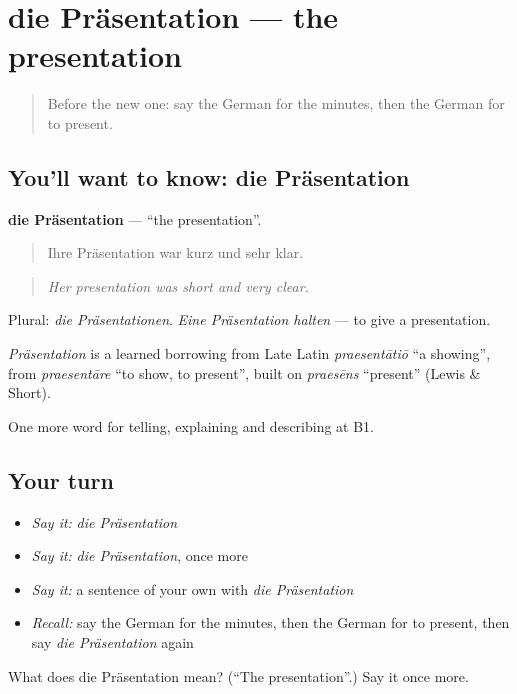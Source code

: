 \section[die Präsentation]{die Präsentation — the presentation}

\label{lesson:GE-C354-praesentation}



\begin{quote}
Before the new one: say the German for the minutes, then the German for to present.
\end{quote}

\subsection*{You'll want to know: die Präsentation}
\textbf{die Präsentation} — \textquotedblleft{}the presentation\textquotedblright{}.

\begin{quote}
Ihre Präsentation war kurz und sehr klar.
\end{quote}

\begin{quote}
\emph{Her presentation was short and very clear.}
\end{quote}

Plural: \emph{die Präsentationen}. \emph{Eine Präsentation halten} — to give a presentation.

\begin{cousinweb}
\emph{Präsentation} is a learned borrowing from Late Latin \emph{praesentātiō} \textquotedblleft{}a showing\textquotedblright{}, from \emph{praesentāre} \textquotedblleft{}to show, to present\textquotedblright{}, built on \emph{praesēns} \textquotedblleft{}present\textquotedblright{} (Lewis \& Short).
\end{cousinweb}

\begin{grammarlens}[title={What you've built}]
One more word for telling, explaining and describing at B1.
\end{grammarlens}

\subsection*{Your turn}
\begin{itemize}
\raggedright
  \item \emph{Say it:} \emph{die Präsentation}
  \item \emph{Say it:} \emph{die Präsentation}, once more
  \item \emph{Say it:} a sentence of your own with \emph{die Präsentation}
  \item \emph{Recall:} say the German for the minutes, then the German for to present, then say \emph{die Präsentation} again
\end{itemize}

\begin{tcolorbox}[breakable,colback=teal!4,colframe=teal!35!black,title={Before you move on}]
What does die Präsentation mean? (\textquotedblleft{}The presentation\textquotedblright{}.) Say it once more.
\end{tcolorbox}
